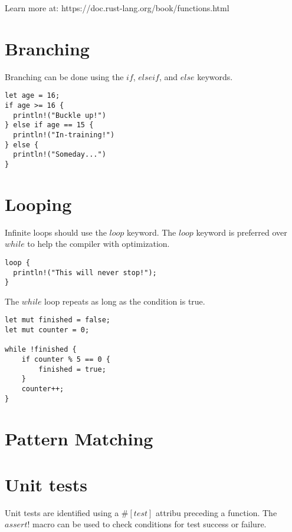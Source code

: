 \documentclass[letterpaper,landscape]{article}
\begin{document}
\begin{multicols}{3}
Learn more at: https://doc.rust-lang.org/book/functions.html

\section*{Branching}

Branching can be done using the $if$, $else if$, and $else$ keywords.

\begin{verbatim}
let age = 16;
if age >= 16 {
  println!("Buckle up!")
} else if age == 15 {
  println!("In-training!")
} else {
  println!("Someday...")
}
\end{verbatim}

\section*{Looping}

Infinite loops should use the $loop$ keyword. The $loop$ keyword is preferred over $while$ to help the compiler with optimization.

\begin{verbatim}
loop {
  println!("This will never stop!");
}

\end{verbatim}

The $while$ loop repeats as long as the condition is true.

\begin{verbatim}
let mut finished = false;
let mut counter = 0;

while !finished {
    if counter % 5 == 0 {
        finished = true;
    }
    counter++;
}
\end{verbatim}

\section*{Pattern Matching}

\section*{Unit tests}

Unit tests are identified using a $\#[test]$ attribu preceding a function. The $assert!$ macro can be used to check conditions for test success or failure.


\end{multicols}
\end{document}
